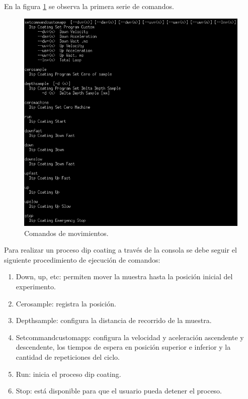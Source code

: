 En la figura \ref{fig:consola_movimientos} se observa la primera serie de comandos. 
\begin{figure}[h!]
	\centering
	\includegraphics[width=1\textwidth]{./Figures/consola_2.png}
	\caption{Comandos de movimientos.}
	\label{fig:consola_movimientos}
\end{figure}



Para realizar un proceso dip coating a través de la consola se debe seguir el siguiente procedimiento de ejecución de comandos:
\begin{enumerate}
\item Down, up, etc: permiten mover la muestra hasta la posición inicial del experimento.
\item Cerosample: registra la posición.
\item Depthsample: configura la distancia de recorrido de la muestra.
\item Setcommandcustomapp: configura la velocidad y aceleración ascendente y descendente, los tiempos de espera en posición superior e inferior y la cantidad de repeticiones del ciclo.
\item Run: inicia el proceso dip coating.
\item Stop: está disponible para que el usuario pueda detener el proceso.

\end{enumerate}


